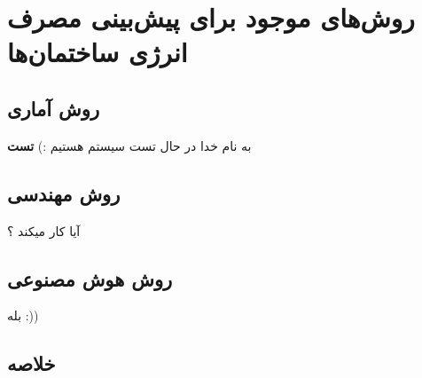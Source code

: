 \chapter{روش‌های موجود برای پیش‌بینی مصرف انرژی ساختمان‌ها}

\section{روش آماری}
به نام خدا در حال تست سیستم هستیم :)
\textbf{تست}
\section{روش مهندسی}
آیا کار میکند ؟
\section{روش هوش مصنوعی}
بله :))
\section{خلاصه}